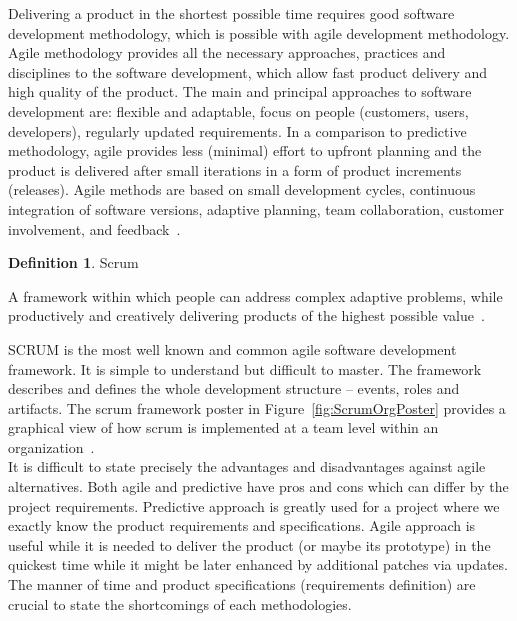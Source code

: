 \documentclass[12pt,a4paper]{article}
\theoremstyle{definition}
\newtheorem{definition}{Definition}[section]
\begin{document}
    Delivering a product in the shortest possible time requires good software development methodology, which is possible with agile development methodology. Agile methodology provides all the necessary approaches, practices and disciplines to the software development, which allow fast product delivery and high quality of the product. The main and principal approaches to software development are: flexible and adaptable, focus on people (customers, users, developers), regularly updated requirements. In a comparison to predictive methodology, agile provides less (minimal) effort to upfront planning and the product is delivered after small iterations in a form of product increments (releases). Agile methods are based on small development cycles, continuous integration of software versions, adaptive planning, team collaboration, customer involvement, and feedback~\cite{YOUNAS2018142}.

    \begin{definition}
        Scrum\\[-5mm]
        \begin{center}
            \begin{minipage}{0.9\textwidth}
                A framework within which people can address complex adaptive problems, while productively and creatively delivering products of the highest possible value~\cite{ScrumOrgGuide}.\\[-2.5mm]
            \end{minipage}
        \end{center}
    \end{definition}

    SCRUM is the most well known and common agile software development framework. It is simple to understand but difficult to master. The framework describes and defines the whole development structure -- events, roles and artifacts. The scrum framework poster in Figure~\ref{fig:ScrumOrgPoster} provides a graphical view of how scrum is implemented at a team level within an organization~\cite{ScrumOrgPoster}.\\

    It is difficult to state precisely the advantages and disadvantages against agile alternatives. Both agile and predictive have pros and cons which can differ by the project requirements. Predictive approach is greatly used for a project where we exactly know the product requirements and specifications. Agile approach is useful while it is needed to deliver the product (or maybe its prototype) in the quickest time while it might be later enhanced by additional patches via updates. The manner of time and product specifications (requirements definition) are crucial to state the shortcomings of each methodologies.
\end{document}
